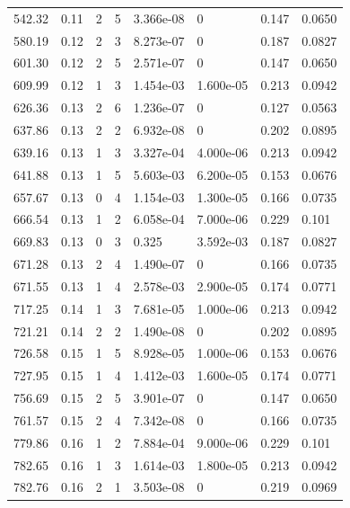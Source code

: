\documentclass[preview]{standalone}
\begin{document}
{{{\begin{tabular}{L{1.2cm}C{1.2cm} C{0.3cm}C{0.5cm} C{1.4cm}C{1.4cm} C{1.4cm}C{1.4cm}}
  542.32  &  0.11  & 2     &  5 &  3.366e-08  & 0  & 0.147 &  0.0650   \\ 
  580.19  &  0.12  & 2     &  3 &  8.273e-07  & 0  & 0.187 &  0.0827   \\ 
  601.30  &  0.12  & 2     &  5 &  2.571e-07  & 0  & 0.147 &  0.0650   \\ 
  609.99  &  0.12  & 1     &  3 &  1.454e-03  & 1.600e-05  & 0.213 &  0.0942   \\ 
  626.36  &  0.13  & 2     &  6 &  1.236e-07  & 0  & 0.127 &  0.0563   \\ 
  637.86  &  0.13  & 2     &  2 &  6.932e-08  & 0  & 0.202 &  0.0895   \\ 
  639.16  &  0.13  & 1     &  3 &  3.327e-04  & 4.000e-06  & 0.213 &  0.0942   \\ 
  641.88  &  0.13  & 1     &  5 &  5.603e-03  & 6.200e-05  & 0.153 &  0.0676   \\ 
  657.67  &  0.13  & 0     &  4 &  1.154e-03  & 1.300e-05  & 0.166 &  0.0735   \\ 
  666.54  &  0.13  & 1     &  2 &  6.058e-04  & 7.000e-06  & 0.229 &  0.101   \\ 
  669.83  &  0.13  & 0     &  3 &  0.325  & 3.592e-03  & 0.187 &  0.0827   \\ 
  671.28  &  0.13  & 2     &  4 &  1.490e-07  & 0  & 0.166 &  0.0735   \\ 
  671.55  &  0.13  & 1     &  4 &  2.578e-03  & 2.900e-05  & 0.174 &  0.0771   \\ 
  717.25  &  0.14  & 1     &  3 &  7.681e-05  & 1.000e-06  & 0.213 &  0.0942   \\ 
  721.21  &  0.14  & 2     &  2 &  1.490e-08  & 0  & 0.202 &  0.0895   \\ 
  726.58  &  0.15  & 1     &  5 &  8.928e-05  & 1.000e-06  & 0.153 &  0.0676   \\ 
  727.95  &  0.15  & 1     &  4 &  1.412e-03  & 1.600e-05  & 0.174 &  0.0771   \\ 
  756.69  &  0.15  & 2     &  5 &  3.901e-07  & 0  & 0.147 &  0.0650   \\ 
  761.57  &  0.15  & 2     &  4 &  7.342e-08  & 0  & 0.166 &  0.0735   \\ 
  779.86  &  0.16  & 1     &  2 &  7.884e-04  & 9.000e-06  & 0.229 &  0.101   \\ 
  782.65  &  0.16  & 1     &  3 &  1.614e-03  & 1.800e-05  & 0.213 &  0.0942   \\ 
  782.76  &  0.16  & 2     &  1 &  3.503e-08  & 0  & 0.219 &  0.0969   \\ 

\end{tabular}}}}
\end{document}
